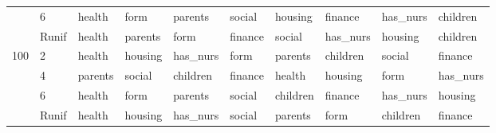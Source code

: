 \begin{table}[htbp]
\begin{tabular}{llllllllll}
 & 6 & health & form & parents & social & housing & finance & has_nurs & children \\
 & Runif & health & parents & form & finance & social & has_nurs & housing & children \\
\multirow[c]{4}{*}{100} & 2 & health & housing & has_nurs & form & parents & children & social & finance \\
 & 4 & parents & social & children & finance & health & housing & form & has_nurs \\
 & 6 & health & form & parents & social & children & finance & has_nurs & housing \\
 & Runif & health & housing & has_nurs & social & parents & form & children & finance \\
\bottomrule
\end{tabular}
\end{table}
